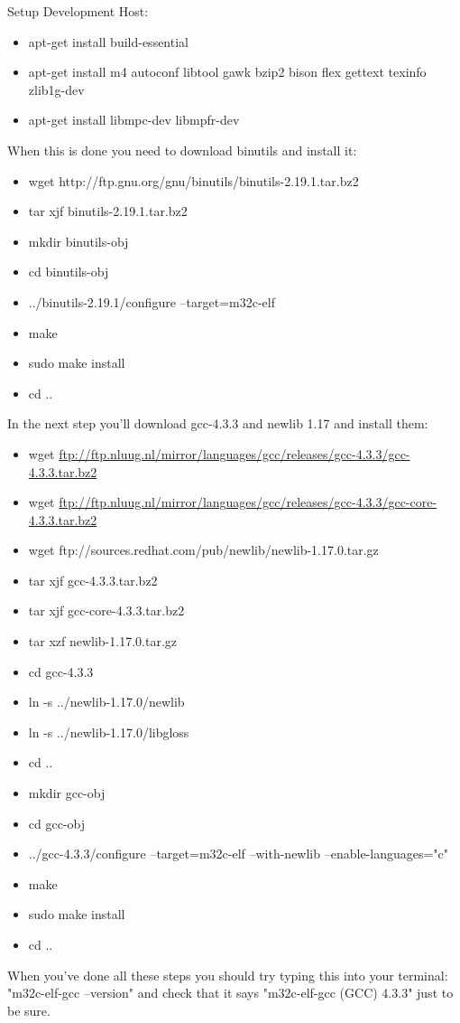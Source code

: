 Setup Development Host:
\begin{itemize}
\item apt-get install build-essential
\item apt-get install m4 autoconf libtool gawk bzip2 bison flex gettext texinfo zlib1g-dev 
\item apt-get install libmpc-dev libmpfr-dev
\end{itemize}

\noindent When this is done you need to download binutils and install it:
\begin{itemize}
\item wget http://ftp.gnu.org/gnu/binutils/binutils-2.19.1.tar.bz2
\item tar xjf binutils-2.19.1.tar.bz2
\item mkdir binutils-obj
\item cd binutils-obj
\item ../binutils-2.19.1/configure --target=m32c-elf
\item make
\item sudo make install
\item cd ..
\end{itemize}

\noindent In the next step you'll download gcc-4.3.3 and newlib 1.17 and install them:
\begin{itemize}
\item wget \url{ftp://ftp.nluug.nl/mirror/languages/gcc/releases/gcc-4.3.3/gcc-4.3.3.tar.bz2}
\item wget \url{ftp://ftp.nluug.nl/mirror/languages/gcc/releases/gcc-4.3.3/gcc-core-4.3.3.tar.bz2}
\item wget ftp://sources.redhat.com/pub/newlib/newlib-1.17.0.tar.gz
\item tar xjf gcc-4.3.3.tar.bz2
\item tar xjf gcc-core-4.3.3.tar.bz2
\item tar xzf newlib-1.17.0.tar.gz
\item cd gcc-4.3.3
\item ln -s ../newlib-1.17.0/newlib
\item ln -s ../newlib-1.17.0/libgloss
\item cd ..
\item mkdir gcc-obj
\item cd gcc-obj
\item ../gcc-4.3.3/configure --target=m32c-elf --with-newlib --enable-languages="c"
\item make
\item sudo make install
\item cd ..
\end{itemize}
When you've done all these steps you should try typing this into your terminal: "m32c-elf-gcc --version" and check that it says "m32c-elf-gcc (GCC) 4.3.3" just to be sure.

